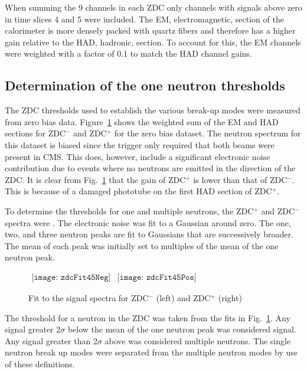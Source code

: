       When summing the 9 channels in each ZDC only channels with signals above 
        zero in time slices 4 and 5 were included. 
      The EM, electromagnetic, section of the calorimeter is more densely 
        packed with quartz fibers and therefore has a higher gain relative to 
        the HAD, hadronic, section. 
      To account for this, the EM channels were weighted with
        a factor of 0.1 to match the HAD channel gains.

    \subsection{Determination of the one neutron thresholds}
      The ZDC thresholds used to establish the various break-up modes were 
        measured from zero bias data.
      Figure~\ref{fig:zdcM2Fit} shows the weighted sum of the EM and 
        HAD sections for  ZDC$^{-}$ and  ZDC$^{+}$ for the zero bias 
        dataset.
      The neutron spectrum for this dataset is \DIFaddbegin {}\DIFaddend biased since the 
        trigger only required that both beams were present in CMS. 
      This \DIFaddbegin {}\DIFaddend does, however, include a significant electronic noise contribution due
        to events where no neutrons are emitted in the direction of the ZDC.
      It is clear from Fig.~\ref{fig:zdcM2Fit} that the gain of  
        ZDC$^{+}$ is lower than that of ZDC$^{-}$. 
      This is because of a damaged phototube on the first HAD section 
        of ZDC$^{+}$.

      To determine the thresholds for one and multiple neutrons, the ZDC$^{+}$ 
        and ZDC$^{-}$ spectra were 
        \DIFdelbegin {}\DIFdelend \DIFaddbegin {}\DIFaddend . 
      The electronic noise was fit to a Gaussian around zero.
      The one, two, and three neutron peaks are fit to Gaussians that are 
        successively broader.
      The mean of each peak was initially set to multiples of the mean of the 
        one neutron peak. 
      \begin{figure}[!Hh]
        \centering
        $ 
          \begin{array}{cc}
            \texttt{[image: zdcFit45Neg]} &
            \texttt{[image: zdcFit45Pos]}
          \end{array} 
        $
        \caption{Fit to the signal spectra for ZDC$^{-}$ (left) and ZDC$^{+}$ 
          (right)}
        \label{fig:zdcM2Fit}
      \end{figure}
      The threshold for a neutron in the ZDC was taken from the fits in 
        Fig.~\ref{fig:zdcM2Fit}.
      Any signal greater 2$\sigma$ below the mean of the one neutron peak was 
        considered signal.
      Any signal greater than 2$\sigma$ above was considered multiple 
        neutrons.
      The single neutron break up modes were separated from the multiple 
        neutron modes by use of these definitions.

